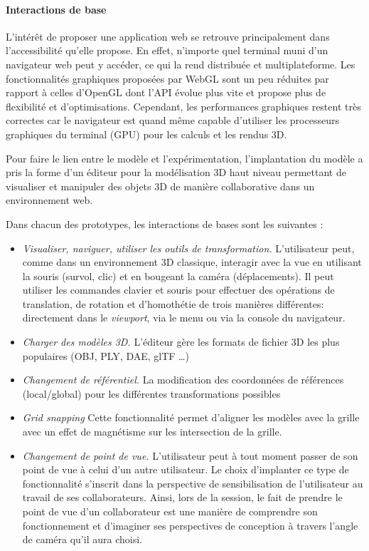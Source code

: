 \paragraph{Interactions de base}
L'intérêt de proposer une application web se retrouve principalement dans 
l'accessibilité qu'elle propose. 
En effet, n'importe quel terminal muni d'un navigateur web peut y accéder, ce qui 
la rend distribuée et multiplateforme. 
Les fonctionnalités graphiques proposées par WebGL sont un peu réduites par 
rapport à celles d'OpenGL dont l'\gls{API} évolue plus vite et propose plus de 
flexibilité et d'optimisations. Cependant, les performances graphiques restent très 
correctes car le navigateur est quand même capable d'utiliser les processeurs 
graphiques du terminal (\gls{GPU}) pour les calculs et les rendus \gls{3D}.

Pour faire le lien entre le modèle et l'expérimentation, l'implantation du modèle a 
pris la forme d'un éditeur pour la modélisation \gls{3D} haut niveau permettant de 
visualiser et manipuler des objets \gls{3D} de manière collaborative dans un 
environnement web.

Dans chacun des prototypes, les interactions de bases sont les suivantes :
\begin{itemize}
	
	\item \textit{Visualiser, naviguer, utiliser les outils de transformation.} 
	L'utilisateur peut, 
	com\-me dans un environnement \gls{3D} classique, interagir avec la vue en 
	utilisant 
	la souris (survol, clic) et en bougeant la caméra (déplacements). Il peut 
	utiliser les commandes clavier et souris pour effectuer des opérations de 
	translation, de rotation et d'homothétie de trois manières différentes: 
	directement dans le \textit{viewport}, via le 
	menu ou via la console du navigateur.
	\item \textit{Charger des modèles \gls{3D}.} L'éditeur gère les formats de 
	fichier 3D les plus populaires (OBJ, PLY, DAE, glTF \dots)
	\item \textit{Changement de référentiel.} La modification des coordonnées de 
	réfé\-ren\-ces (local/global)  pour les différentes transformations possibles
	\item \textit{Grid snapping} Cette fonctionnalité permet d'aligner les modèles 
	avec la 
	grille avec un effet de magnétisme sur les intersection de la grille.
	\item \textit{Changement de point de vue.} L'utilisateur peut à tout moment 
	passer de 
	son point de vue à celui d'un autre utilisateur. Le choix d'implanter ce type de 
	fonctionnalité s'inscrit dans la perspective de sensibilisation de l'utilisateur au 
	travail de ses collaborateurs. Ainsi, lors de la session, le fait de prendre le 
	point de vue d'un collaborateur est une manière de 
	comprendre son fonctionnement et d'imaginer ses 
	perspectives de conception à travers l'angle de caméra qu'il aura choisi.
\end{itemize}

